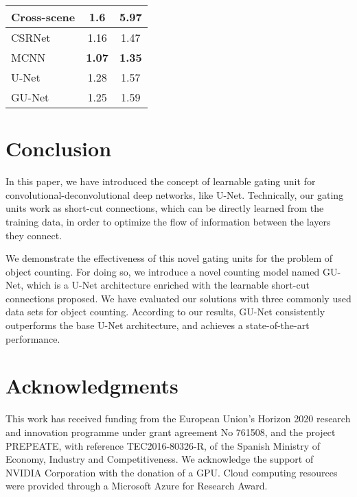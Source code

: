 \documentclass{bmvc2k}
\begin{document}
\begin{table}
{\begin{tabular}{|l|c|c|}
\hline
Cross-scene \cite{zhang_2015_CVPR}               & 1.6                     & 5.97 \\
\hline
CSRNet \cite{yuhong2018_csrnet}                  & 1.16                    & 1.47 \\
\hline
MCNN \cite{zhang2016}                            & \textbf{1.07}                    & \textbf{1.35} \\
\hline
\hline
U-Net                                            & 1.28                    & 1.57 \\
\hline
GU-Net                                           & 1.25                    & 1.59 \\
\hline
\end{tabular}
}%
\vspace{-0.3cm}

\end{table}

\section{Conclusion}

In this paper, we have introduced the concept of learnable gating unit for convolutional-deconvolutional deep networks, like U-Net. Technically, our gating units work as short-cut connections, which can be directly learned from the training data, in order to optimize the flow of information between the layers they connect.

We demonstrate the effectiveness of this novel gating units for the problem of object counting. For doing so, we introduce a novel counting model named GU-Net, which is a U-Net architecture enriched with the learnable short-cut connections proposed. We have evaluated our solutions with three commonly used data sets for object counting. According to our results, GU-Net consistently outperforms the base U-Net architecture, and achieves a state-of-the-art performance.

\section*{Acknowledgments}
This work has received funding from the European Union's Horizon 2020 research and innovation programme under grant agreement No 761508, and the project PREPEATE, with reference TEC2016-80326-R, of the Spanish Ministry of Economy, Industry and Competitiveness. We acknowledge the support of NVIDIA Corporation with the donation of a GPU. Cloud computing resources were provided through a Microsoft Azure for Research Award.


\end{document}
